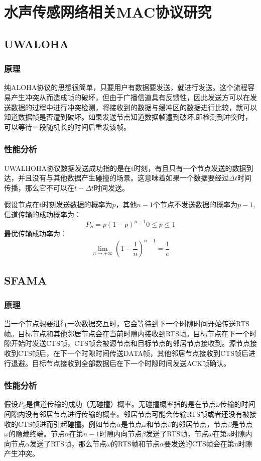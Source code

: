 \chapter{水声传感网络相关MAC协议研究 }
\section{UWALOHA}
\subsection{原理}
纯ALOHA协议的思想很简单，只要用户有数据要发送，就进行发送。这个流程容易产生冲突从而造成帧的破坏，但由于广播信道具有反馈性，因此发送方可以在发送数据的过程中进行冲突检测，将接收到的数据与缓冲区的数据进行比较，就可以知道数据帧是否遭到破坏。如果发送节点知道数据帧遭到破坏,即检测到冲突时，可以等待一段随机长的时间后重发该帧。
\subsection{性能分析}
\cite{Analysis of Aloha Protocols for Underwater Acoustic Sensor Networks}
UWALHOHA协议数据发送成功指的是在t时刻，有且只有一个节点发送的数据到达，并且没有与其他数据产生碰撞的场景。这意味着如果一个数据要经过$\Delta t$时间传播，那么它不可以在$t-\Delta t$时间发送。

假设节点在t时刻发送数据的概率为$p$，其他$n-1$个节点不发送数据的概率为$p-1$,信道传输的成功概率为：
\begin{equation}
P_S=p(1-p)^{n-1}   0\le p\le 1
\end{equation}
最优传输成功率为：
\begin{equation}
\lim\limits_{n\to+\infty} (1-\frac{1}{n})^{n-1}=\frac{1}{e}
\end{equation}
\section{SFAMA}

\subsection{原理}
当一个节点想要进行一次数据交互时，它会等待到下一个时隙时间开始传送RTS帧。目标节点和其他邻居节点会在当前时隙内接收到RTS帧。目标节点在下一个时隙开始时发送CTS帧，CTS帧会被源节点和目标节点的邻居节点接收到。源节点接收到CTS帧后，在下一个时隙时间传送DATA帧，其他邻居节点接收到CTS帧后进行退避。目标节点接收到全部数据后在下一个时隙时间发送ACK帧确认。
\subsection{性能分析}
假设$P_S$是信道传输的成功（无碰撞）概率。无碰撞概率指的是在节点$\omega$传输的时间间隙内没有邻居节点进行传输的概率。邻居节点可能会传输RTS帧或者还没有被接收的CTS帧进而引起碰撞。例如节点$\alpha$是节点$\omega$和节点$\beta$的邻居节点，节点$\beta$是节点$\omega$的隐藏终端。节点$\alpha$在第$n-1$时隙内向节点$\beta$发送了RTS帧，节点$\omega$在第$n$时隙内向节点$\alpha$发送了RTS帧，那么节点$\omega$的RTS帧和节点$\alpha$要发送的CTS帧会在第n时隙产生冲突。

